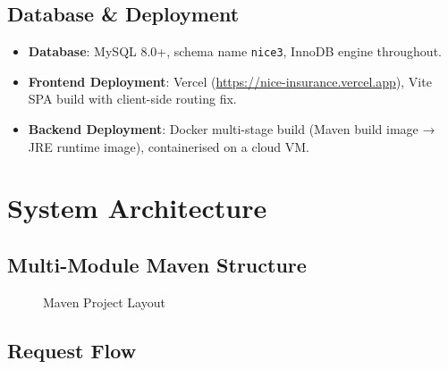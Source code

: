 \documentclass[12pt,letterpaper]{article}
\begin{document}
\subsection{Database \& Deployment}

\begin{itemize}
  \item \textbf{Database}: MySQL 8.0+, schema name \texttt{nice3}, InnoDB engine throughout.
  \item \textbf{Frontend Deployment}: Vercel (\url{https://nice-insurance.vercel.app}), Vite SPA build with client-side routing fix.
  \item \textbf{Backend Deployment}: Docker multi-stage build (Maven build image → JRE runtime image), containerised on a cloud VM.
\end{itemize}

\newpage
\section{System Architecture}

\subsection{Multi-Module Maven Structure}

\begin{figure}[htbp]
    \centering
    \begin{minipage}{\textwidth} %
    \end{minipage}
    \caption{Maven Project Layout}
\end{figure}

\subsection{Request Flow}
\end{document}
